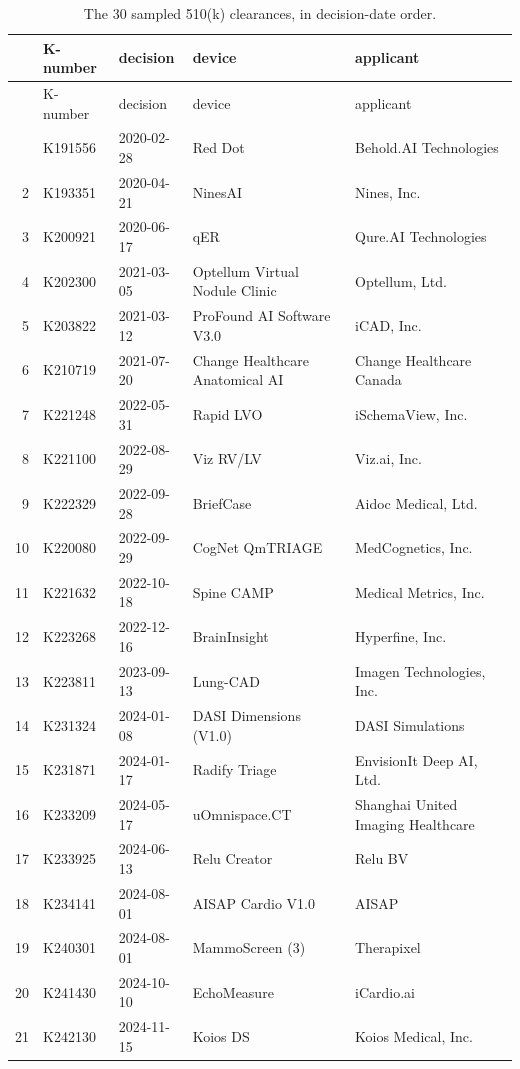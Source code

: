 \documentclass[11pt,a4paper]{article}
\begin{document}
{\small
\begin{longtable}{@{}rllL{4.6cm}L{3.9cm}@{}}
\caption{The 30 sampled 510(k) clearances, in decision-date order.}
\label{tab:fda}\\
\toprule
& K-number & decision & device & applicant \\
\midrule
\endfirsthead
\toprule
& K-number & decision & device & applicant \\
\midrule
\endhead
\bottomrule
{}  & K191556 & 2020-02-28 & Red Dot & Behold.AI Technologies \\
2  & K193351 & 2020-04-21 & NinesAI & Nines, Inc. \\
3  & K200921 & 2020-06-17 & qER & Qure.AI Technologies \\
4  & K202300 & 2021-03-05 & Optellum Virtual Nodule Clinic & Optellum, Ltd. \\
5  & K203822 & 2021-03-12 & ProFound AI Software V3.0 & iCAD, Inc. \\
6  & K210719 & 2021-07-20 & Change Healthcare Anatomical AI & Change Healthcare Canada \\
7  & K221248 & 2022-05-31 & Rapid LVO & iSchemaView, Inc. \\
8  & K221100 & 2022-08-29 & Viz RV/LV & Viz.ai, Inc. \\
9  & K222329 & 2022-09-28 & BriefCase & Aidoc Medical, Ltd. \\
10 & K220080 & 2022-09-29 & CogNet QmTRIAGE & MedCognetics, Inc. \\
11 & K221632 & 2022-10-18 & Spine CAMP & Medical Metrics, Inc. \\
12 & K223268 & 2022-12-16 & BrainInsight & Hyperfine, Inc. \\
13 & K223811 & 2023-09-13 & Lung-CAD & Imagen Technologies, Inc. \\
14 & K231324 & 2024-01-08 & DASI Dimensions (V1.0) & DASI Simulations \\
15 & K231871 & 2024-01-17 & Radify Triage & EnvisionIt Deep AI, Ltd. \\
16 & K233209 & 2024-05-17 & uOmnispace.CT & Shanghai United Imaging Healthcare \\
17 & K233925 & 2024-06-13 & Relu Creator & Relu BV \\
18 & K234141 & 2024-08-01 & AISAP Cardio V1.0 & AISAP \\
19 & K240301 & 2024-08-01 & MammoScreen (3) & Therapixel \\
20 & K241430 & 2024-10-10 & EchoMeasure & iCardio.ai \\
21 & K242130 & 2024-11-15 & Koios DS & Koios Medical, Inc. \\

\end{longtable}}
\end{document}
